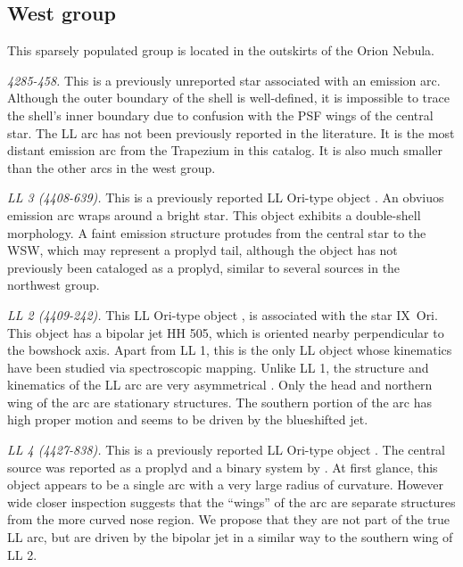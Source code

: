 \documentclass[iop, apj]{emulateapj}
\renewcommand\clearpage{}
\begin{document}
\clearpage
\subsection{West group}
\label{sec:w-group}



This sparsely populated group is located in the outskirts of the Orion Nebula. 

\textit{4285-458.} This is a previously unreported star associated with an emission arc. Although the outer boundary of the shell is well-defined, it is impossible to trace the shell's inner boundary due to confusion with the PSF wings of the central star. The LL arc has not been previously reported in the literature. It is the most distant emission arc from the Trapezium in this catalog. It is also much smaller than the other arcs in the west group.  

\textit{LL 3 (4408-639).} This is a previously reported LL Ori-type object \citep{Bally:2001a}. An obviuos emission arc wraps around a bright star. This object exhibits a double-shell morphology. A faint emission structure protudes from the central star to the WSW, which may represent a proplyd tail, although the object has not previously been cataloged as a proplyd, similar to several sources in the northwest group.    

\textit{LL 2 (4409-242).} This LL Ori-type object \citep{Bally:2001a}, is associated with the star IX~Ori. This object has a bipolar jet HH 505, which is oriented nearby perpendicular to the bowshock axis. Apart from LL 1, this is the only LL object whose kinematics have been studied via spectroscopic mapping. Unlike LL 1, the structure and kinematics of the LL arc are very asymmetrical \citep{Henney:2013a}. Only the head and northern wing of the arc are stationary structures. The southern portion of the arc has high proper motion and seems to be driven by the blueshifted jet.  

\textit{LL 4 (4427-838).} This is a previously reported LL Ori-type object \citep{Bally:2001a}. The central source was reported as a proplyd and a binary system by \citet{Bally:2006a}. At first glance, this object appears to be a single arc with a very large radius of curvature. However wide closer inspection suggests that the ``wings'' of the arc are separate structures from the more curved nose region. We propose that they are not part of the true LL arc, but are driven by the bipolar jet \citep{Bally:2006a} in a similar way to the southern wing of LL 2.     
\end{document}
